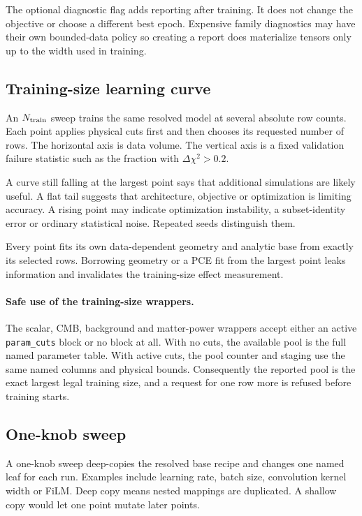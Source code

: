 \documentclass[10pt,aps,prd,twocolumn,nofootinbib]{revtex4-2}
\newcommand{\code}[1]{\texttt{#1}}
\begin{document}
The optional diagnostic flag adds reporting after training.  It does not
change the objective or choose a different best epoch.  Expensive family
diagnostics may have their own bounded-data policy so creating a report does
materialize tensors only up to the width used in training.

\subsection{Training-size learning curve}

An \(N_{\rm train}\) sweep trains the same resolved model at several absolute
row counts.  Each point applies physical cuts first and then chooses its
requested number of rows.  The horizontal axis is data volume.  The vertical
axis is a fixed validation failure statistic such as the fraction with
\(\Delta\chi^2>0.2\).

A curve still falling at the largest point says that additional simulations
are likely useful.  A flat tail suggests that architecture, objective or
optimization is limiting accuracy.  A rising point may indicate optimization
instability, a subset-identity error or ordinary statistical noise.  Repeated
seeds distinguish them.

Every point fits its own data-dependent geometry and analytic base from exactly
its selected rows.  Borrowing geometry or a PCE fit from the largest point
leaks information and invalidates the training-size effect measurement.

\paragraph{Safe use of the training-size wrappers.}
The scalar, CMB, background and matter-power wrappers accept either an active
\code{param\_cuts} block or no block at all.  With no cuts, the available pool
is the full named parameter table.  With active cuts, the pool counter and
staging use the same named columns and physical bounds.  Consequently the
reported pool is the exact largest legal training size, and a request for one
row more is refused before training starts.

\subsection{One-knob sweep}

A one-knob sweep deep-copies the resolved base recipe and changes one named
leaf for each run.  Examples include learning rate, batch size, convolution
kernel width or FiLM.  Deep copy means nested mappings are duplicated.  A
shallow copy would let one point mutate later points.
\end{document}
